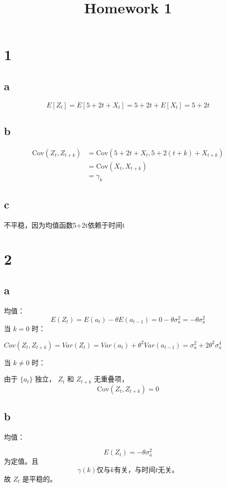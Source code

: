 \documentclass{article}
\title{Homework 1}
\author{}
\date{}
\begin{document}
\maketitle

\section*{1}
\subsection*{a}
\[
E[Z_t] = E[5 + 2t + X_t] = 5 + 2t + E[X_t] = 5 + 2t
\]

\subsection*{b}
\[
\begin{aligned}
\text{Cov}(Z_t, Z_{t+k}) &= \text{Cov}(5 + 2t + X_t, 5 + 2(t+k) + X_{t+k}) \\
&= \text{Cov}(X_t, X_{t+k}) \\
&= \gamma_k
\end{aligned}
\]

\subsection*{c}
不平稳，因为均值函数5+2t依赖于时间t

\section*{2}
\subsection*{a}
均值：
\[
E(Z_t) = E(a_t) - \theta E(a_{t-1}) = 0 - \theta \sigma_a^2 = -\theta \sigma_a^2
\]
当 $k=0$ 时：

$Cov(Z_t, Z_{t+k}) = Var(Z_t) = Var(a_t) + \theta^2 Var(a_{t-1}) = \sigma_a^2 + 2\theta^2 \sigma_a^4 $


当 $k \neq 0$ 时：

由于 $\{a_t\}$ 独立，
$Z_t$ 和 $Z_{t+k}$ 无重叠项，
\[
\text{Cov}(Z_t, Z_{t+k}) = 0
\]

\subsection*{b}
均值：

\[
E(Z_t) = -\theta \sigma_a^2
\]
为定值。且
\[
\gamma(k) 仅与 k 有关，与时间 t 无关。
\]故 $Z_t$ 是平稳的。
\end{document}

